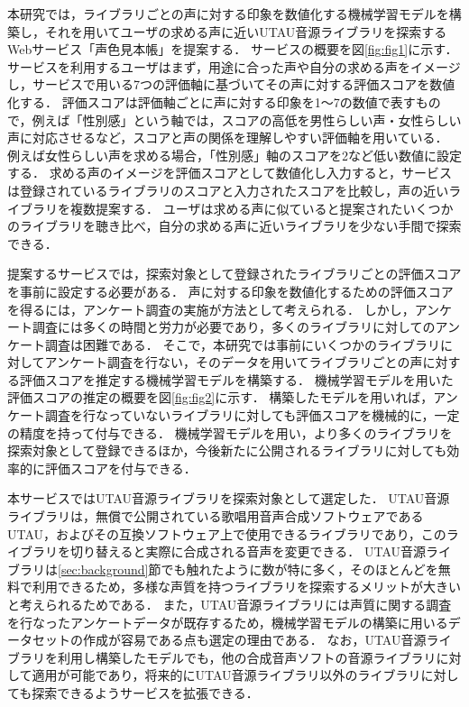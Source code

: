 本研究では，ライブラリごとの声に対する印象を数値化する機械学習モデルを構築し，それを用いてユーザの求める声に近いUTAU音源ライブラリを探索するWebサービス「声色見本帳」を提案する．
サービスの概要を図\ref{fig:fig1}に示す．
サービスを利用するユーザはまず，用途に合った声や自分の求める声をイメージし，サービスで用いる7つの評価軸に基づいてその声に対する評価スコアを数値化する．
評価スコアは評価軸ごとに声に対する印象を1〜7の数値で表すもので，例えば「性別感」という軸では，スコアの高低を男性らしい声・女性らしい声に対応させるなど，スコアと声の関係を理解しやすい評価軸を用いている．
例えば女性らしい声を求める場合，「性別感」軸のスコアを2など低い数値に設定する．
求める声のイメージを評価スコアとして数値化し入力すると，サービスは登録されているライブラリのスコアと入力されたスコアを比較し，声の近いライブラリを複数提案する．
ユーザは求める声に似ていると提案されたいくつかのライブラリを聴き比べ，自分の求める声に近いライブラリを少ない手間で探索できる．

提案するサービスでは，探索対象として登録されたライブラリごとの評価スコアを事前に設定する必要がある．
声に対する印象を数値化するための評価スコアを得るには，アンケート調査の実施が方法として考えられる．
しかし，アンケート調査には多くの時間と労力が必要であり，多くのライブラリに対してのアンケート調査は困難である．
そこで，本研究では事前にいくつかのライブラリに対してアンケート調査を行ない，そのデータを用いてライブラリごとの声に対する評価スコアを推定する機械学習モデルを構築する．
機械学習モデルを用いた評価スコアの推定の概要を図\ref{fig:fig2}に示す．
構築したモデルを用いれば，アンケート調査を行なっていないライブラリに対しても評価スコアを機械的に，一定の精度を持って付与できる．
機械学習モデルを用い，より多くのライブラリを探索対象として登録できるほか，今後新たに公開されるライブラリに対しても効率的に評価スコアを付与できる．

本サービスではUTAU音源ライブラリを探索対象として選定した．
UTAU音源ライブラリは，無償で公開されている歌唱用音声合成ソフトウェアであるUTAU，およびその互換ソフトウェア上で使用できるライブラリであり，このライブラリを切り替えると実際に合成される音声を変更できる．
UTAU音源ライブラリは\ref{sec:background}節でも触れたように数が特に多く，そのほとんどを無料で利用できるため，多様な声質を持つライブラリを探索するメリットが大きいと考えられるためである．
また，UTAU音源ライブラリには声質に関する調査を行なったアンケートデータが既存するため，機械学習モデルの構築に用いるデータセットの作成が容易である点も選定の理由である．
なお，UTAU音源ライブラリを利用し構築したモデルでも，他の合成音声ソフトの音源ライブラリに対して適用が可能であり，将来的にUTAU音源ライブラリ以外のライブラリに対しても探索できるようサービスを拡張できる．

